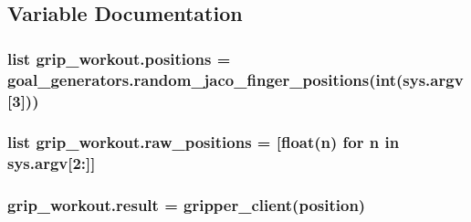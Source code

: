 \subsection{Variable Documentation}
\subsubsection[{\texorpdfstring{positions}{positions}}]{\setlength{\rightskip}{0pt plus 5cm}list grip\+\_\+workout.\+positions = {\bf goal\+\_\+generators.\+random\+\_\+jaco\+\_\+finger\+\_\+positions}(int(sys.\+argv\mbox{[}3\mbox{]}))}\hypertarget{namespacegrip__workout_a3deafc04ebe19165cfdc795ba4f53692}{}\label{namespacegrip__workout_a3deafc04ebe19165cfdc795ba4f53692}
\subsubsection[{\texorpdfstring{raw\+\_\+positions}{raw_positions}}]{\setlength{\rightskip}{0pt plus 5cm}list grip\+\_\+workout.\+raw\+\_\+positions = \mbox{[}float(n) for n in sys.\+argv\mbox{[}2\+:\mbox{]}\mbox{]}}\hypertarget{namespacegrip__workout_a2e28cab9dcd884944ac12b695ad4a773}{}\label{namespacegrip__workout_a2e28cab9dcd884944ac12b695ad4a773}
\subsubsection[{\texorpdfstring{result}{result}}]{\setlength{\rightskip}{0pt plus 5cm}grip\+\_\+workout.\+result = {\bf gripper\+\_\+client}(position)}\hypertarget{namespacegrip__workout_ac8e857bea751845a9f8c3f34d4fa3399}{}\label{namespacegrip__workout_ac8e857bea751845a9f8c3f34d4fa3399}
